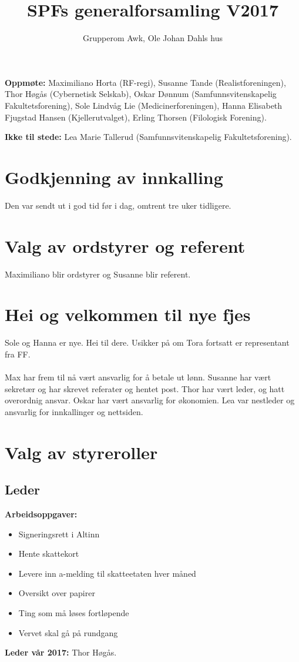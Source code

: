 \documentclass[a4paper,norsk]{article}
\title{SPFs generalforsamling V2017}
\author{Grupperom Awk, Ole Johan Dahls hus}
\begin{document}
\maketitle

\textbf{Oppmøte:} 
    Maximiliano Horta (RF-regi), Susanne Tande (Realistforeningen), Thor Høgås (Cybernetisk Selskab), 
    Oskar Dønnum (Samfunnsvitenskapelig Fakultetsforening), 
    Sole Lindvåg Lie (Medicinerforeningen),
    Hanna Elisabeth Fjugstad Hansen (Kjellerutvalget), Erling Thorsen (Filologisk Forening).

\textbf{Ikke til stede:} Lea Marie Tallerud (Samfunnsvitenskapelig Fakultetsforening).


\section{Godkjenning av innkalling}
Den var sendt ut i god tid før i dag, omtrent tre uker tidligere.

\section{Valg av ordstyrer og referent}
Maximiliano blir ordstyrer og Susanne blir referent.

\section{Hei og velkommen til nye fjes}
Sole og Hanna er nye. Hei til dere. Usikker på om Tora fortsatt er representant fra FF. \\
\\
Max har frem til nå vært ansvarlig for å betale ut lønn. Susanne har vært sekretær og har skrevet referater og hentet post. Thor har vært leder, og hatt overordnig ansvar. Oskar har vært ansvarlig for økonomien. Lea var nestleder og ansvarlig for innkallinger og nettsiden. 
  
\section{Valg av styreroller}
\subsection*{Leder}
\textbf{Arbeidsoppgaver:}
\begin{itemize}
	\item Signeringsrett i Altinn
	\item Hente skattekort
	\item Levere inn a-melding til skatteetaten hver måned
	\item Oversikt over papirer
	\item Ting som må løses fortløpende
	\item Vervet skal gå på rundgang
\end{itemize}
\textbf{Leder vår 2017:} Thor Høgås.
\end{document}
